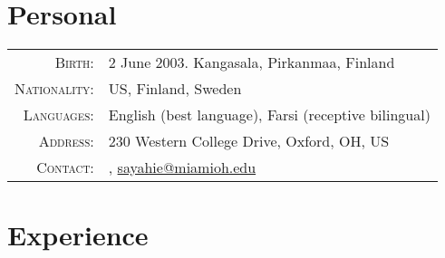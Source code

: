 \documentclass[a4paper,10pt]{article} %
\begin{document}
\pagestyle{empty} %


\par{\bigskip\par} %

\section{Personal}

\footnotesize{\begin{tabular}{rl}
\textsc{Birth:} & 2 June 2003. Kangasala, Pirkanmaa, Finland \\
\textsc{Nationality:} & US, Finland, Sweden \\
\textsc{Languages:} & English (best language), Farsi (receptive bilingual)\\
\textsc{Address:} & 230 Western College Drive, Oxford, OH, US \\
\textsc{Contact:} & \href{tel:+1-513-484-0972}{\color{black}{+1 (513) 484-0972}}, \href{mailto:sayahie@miamioh.edu}{sayahie@miamioh.edu}\\
\end{tabular}}\normalsize


\section{Experience}
\end{document}
